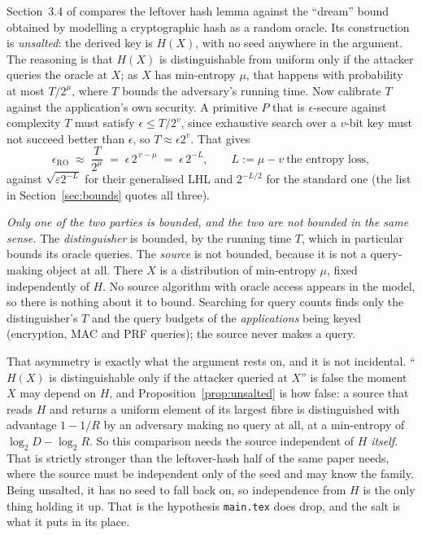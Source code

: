 \documentclass{aicr-solution}
\begin{document}
\begin{remark}\label{rem:roquery}
Section~3.4 of \cite{BDKPPSY11} compares the leftover hash lemma against the ``dream'' bound
obtained by modelling a cryptographic hash as a random oracle. Its construction is \emph{unsalted}:
the derived key is $H(X)$, with no seed anywhere in the argument. The reasoning is that $H(X)$ is
distinguishable from uniform only if the attacker queries the oracle at $X$; as $X$ has min-entropy
$\mu$, that happens with probability at most $T/2^{\mu}$, where $T$ bounds the adversary's running
time. Now calibrate $T$ against the application's own security. A primitive $P$ that is
$\epsilon$-secure against complexity $T$ must satisfy $\epsilon \le T/2^{v}$, since exhaustive
search over a $v$-bit key must not succeed better than $\epsilon$, so $T \approx \epsilon 2^{v}$.
That gives
\[
  \epsilon_{\mathrm{RO}} \;\approx\; \frac{T}{2^{\mu}} \;=\; \epsilon\,2^{\,v-\mu} \;=\;
  \epsilon\,2^{-L} , \qquad L := \mu - v \ \text{the entropy loss} ,
\]
against $\sqrt{\varepsilon 2^{-L}}$ for their generalised LHL and $2^{-L/2}$ for the standard one
(the list in Section~\ref{sec:bounds} quotes all three).

\emph{Only one of the two parties is bounded, and the two are not bounded in the same sense.} The
\emph{distinguisher} is bounded, by the running time $T$, which in particular bounds its oracle
queries. The \emph{source} is not bounded, because it is not a query-making object at all. There
$X$ is a distribution of min-entropy $\mu$, fixed independently of $H$. No source algorithm with
oracle access appears in the model, so there is nothing about it to bound. Searching
\cite{BDKPPSY11} for query counts finds only the distinguisher's $T$ and the query budgets of the
\emph{applications} being keyed (encryption, MAC and PRF queries); the source never makes a query.

That asymmetry is exactly what the argument rests on, and it is not incidental. ``$H(X)$ is
distinguishable only if the attacker queried at $X$'' is false the moment $X$ may depend on $H$, and
Proposition~\ref{prop:unsalted} is how false: a source that reads $H$ and returns a uniform element
of its largest fibre is distinguished with advantage $1 - 1/R$ by an adversary making no query at
all, at a min-entropy of $\log_2 D - \log_2 R$. So this comparison needs the source independent of
$H$ \emph{itself}. That is strictly stronger than the leftover-hash half of the same paper needs,
where the source must be independent only of the seed and may know the family. Being unsalted, it has no seed to fall back
on, so independence from $H$ is the only thing holding it up. That is the hypothesis
\texttt{main.tex} does drop, and the salt is what it puts in its place.


\end{remark}
\end{document}
